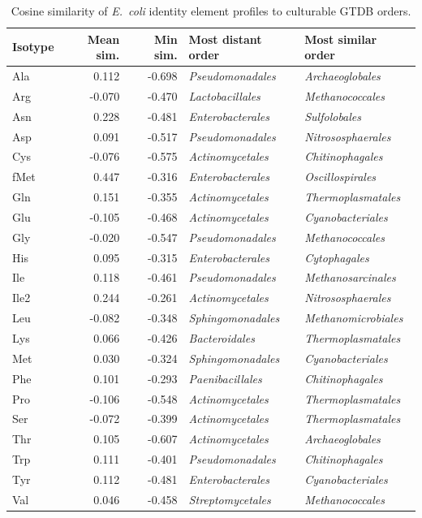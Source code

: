 \begin{table}[!ht]
\centering
\small
\caption{Cosine similarity of \textit{E.~coli} identity element profiles to culturable GTDB orders.}
\label{tab:ecoli_all_culturable}
\begin{tabular}{lrrll}
\toprule
Isotype & Mean sim. & Min sim. & Most distant order & Most similar order \\
\midrule
  Ala & 0.112 & -0.698 & \textit{Pseudomonadales} & \textit{Archaeoglobales} \\
  Arg & -0.070 & -0.470 & \textit{Lactobacillales} & \textit{Methanococcales} \\
  Asn & 0.228 & -0.481 & \textit{Enterobacterales} & \textit{Sulfolobales} \\
  Asp & 0.091 & -0.517 & \textit{Pseudomonadales} & \textit{Nitrososphaerales} \\
  Cys & -0.076 & -0.575 & \textit{Actinomycetales} & \textit{Chitinophagales} \\
  fMet & 0.447 & -0.316 & \textit{Enterobacterales} & \textit{Oscillospirales} \\
  Gln & 0.151 & -0.355 & \textit{Actinomycetales} & \textit{Thermoplasmatales} \\
  Glu & -0.105 & -0.468 & \textit{Actinomycetales} & \textit{Cyanobacteriales} \\
  Gly & -0.020 & -0.547 & \textit{Pseudomonadales} & \textit{Methanococcales} \\
  His & 0.095 & -0.315 & \textit{Enterobacterales} & \textit{Cytophagales} \\
  Ile & 0.118 & -0.461 & \textit{Pseudomonadales} & \textit{Methanosarcinales} \\
  Ile2 & 0.244 & -0.261 & \textit{Actinomycetales} & \textit{Nitrososphaerales} \\
  Leu & -0.082 & -0.348 & \textit{Sphingomonadales} & \textit{Methanomicrobiales} \\
  Lys & 0.066 & -0.426 & \textit{Bacteroidales} & \textit{Thermoplasmatales} \\
  Met & 0.030 & -0.324 & \textit{Sphingomonadales} & \textit{Cyanobacteriales} \\
  Phe & 0.101 & -0.293 & \textit{Paenibacillales} & \textit{Chitinophagales} \\
  Pro & -0.106 & -0.548 & \textit{Actinomycetales} & \textit{Thermoplasmatales} \\
  Ser & -0.072 & -0.399 & \textit{Actinomycetales} & \textit{Thermoplasmatales} \\
  Thr & 0.105 & -0.607 & \textit{Actinomycetales} & \textit{Archaeoglobales} \\
  Trp & 0.111 & -0.401 & \textit{Pseudomonadales} & \textit{Chitinophagales} \\
  Tyr & 0.112 & -0.481 & \textit{Enterobacterales} & \textit{Cyanobacteriales} \\
  Val & 0.046 & -0.458 & \textit{Streptomycetales} & \textit{Methanococcales} \\
\bottomrule
\end{tabular}
\end{table}

